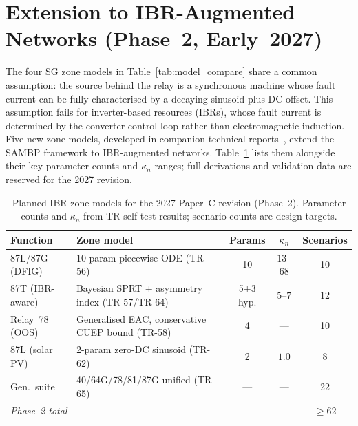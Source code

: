 \documentclass[journal,twoside,10pt]{IEEEtran}
\begin{document}
\section{Extension to IBR-Augmented Networks (Phase~2, Early~2027)}
\label{sec:ibr_extension}

The four SG zone models in Table~\ref{tab:model_compare} share a common
assumption: the source behind the relay is a synchronous machine whose
fault current can be fully characterised by a decaying sinusoid plus
DC offset.
This assumption fails for inverter-based resources (IBRs), whose fault
current is determined by the converter control loop rather than
electromagnetic induction.
Five new zone models, developed in companion technical
reports~\cite{TR56,TR57,TR58,TR62,TR64,TR65}, extend the SAMBP framework
to IBR-augmented networks.
Table~\ref{tab:ibr_models} lists them alongside their key parameter counts
and $\kappa_n$ ranges; full derivations and validation data are reserved
for the 2027 revision.

\begin{table}[!t]
  \renewcommand{\arraystretch}{1.20}
  \caption{Planned IBR zone models for the 2027 Paper~C revision
           (Phase~2). Parameter counts and $\kappa_n$ from
           TR self-test results; scenario counts are design targets.}
  \label{tab:ibr_models}
  \centering
  \small
  \begin{tabular}{llccc}
    \toprule
    Function & Zone model & Params & $\kappa_n$ & Scenarios \\
    \midrule
    87L/87G (DFIG) & 10-param piecewise-ODE (TR-56)
                   & 10 & $13$--$68$ & 10 \\
    87T (IBR-aware)& Bayesian SPRT + asymmetry index (TR-57/TR-64)
                   & 5$+$3 hyp. & $5$--$7$ & 12 \\
    Relay~78 (OOS) & Generalised EAC, conservative CUEP
                     bound (TR-58)
                   & 4 & --- & 10 \\
    87L (solar PV) & 2-param zero-DC sinusoid (TR-62)
                   & 2 & $1.0$ & 8 \\
    Gen.\ suite    & 40/64G/78/81/87G unified (TR-65)
                   & --- & --- & 22 \\
    \midrule
    \multicolumn{2}{l}{\textit{Phase~2 total}} & & & $\geq$62 \\
    \bottomrule
  \end{tabular}
\end{table}
\end{document}

